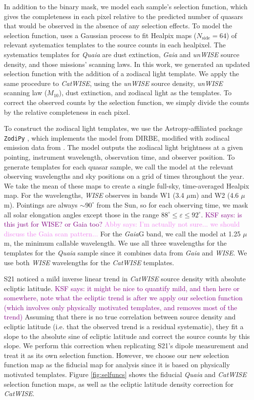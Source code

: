 \documentclass[modern]{aastex631}
\newcommand{\abby}[1]{\textcolor{violet}{Abby says: #1}}
\newcommand{\ksf}[1]{\textcolor{purple}{KSF says: #1}}
\newcommand{\catwise}{\textsl{CatWISE}\xspace}
\newcommand{\quaia}{\textsl{Quaia}\xspace}
\newcommand{\gaia}{\textsl{Gaia}\xspace}
\newcommand{\wise}{\textsl{WISE}\xspace}
\newcommand{\unwise}{\textsl{unWISE}\xspace}
\newcommand{\g}{\mathrm{G}}
\newcommand{\nside}{N_\mathrm{side}}
\begin{document}
In addition to the binary mask, we model each sample's selection function, which gives the completeness in each pixel relative to the predicted number of quasars that would be observed in the absence of any selection effects.
To model the selection function, \cite{storey-fisher_quaia_2024} uses a Gaussian process to fit Healpix maps ($\nside=64$) of relevant systematics templates to the source counts in each healpixel.
The systematics templates for \quaia are dust extinction, \gaia and \unwise source density, and those missions' scanning laws.
In this work, we generated an updated selection function with the addition of a zodiacal light template.
We apply the same procedure to \catwise, using the \unwise source density, \unwise scanning law ($M_{10}$), dust extinction, and zodiacal light as the templates.
To correct the observed counts by the selection function, we simply divide the counts by the relative completeness in each pixel.

To construct the zodiacal light templates, we use the Astropy-affiliated package \texttt{ZodiPy} \citep{san_zodipy_2024}, which implements the \citet{kelsall_cobe_1998} model from DIRBE, modified with zodiacal emission data from \citet{planck_collaboration_planck_2014}.
The model outputs the zodiacal light brightness at a given pointing, instrument wavelength, observation time, and observer position.
To generate templates for each quasar sample, we call the model at the relevant observing wavelengths and sky positions on a grid of times throughout the year.
We take the mean of these maps to create a single full-sky, time-averaged Healpix map.
For the wavelengths, \wise observes in bands W1 (3.4 $\mu$m) and W2 (4.6 $\mu$m).
Pointings are always $\sim 90^\circ$ from the Sun, so for each observing time, we mask all solar elongation angles except those in the range $88^\circ\le\varepsilon\le 92^\circ$. \ksf{is this just for WISE? or Gaia too?}
\abby{I'm actually not sure... we should discuss the Gaia scan pattern...}
For the \gaia $\g$ band, we call the model at 1.25 $\mu$m, the minimum callable wavelength.
We use all three wavelengths for the templates for the \quaia sample since it combines data from \gaia and \wise.
We use both \wise wavelengths for the \catwise templates.

S21 noticed a mild inverse linear trend in \catwise source density with absolute ecliptic latitude. \ksf{it might be nice to quantify mild, and then here or somewhere, note what the ecliptic trend is after we apply our selection function (which involves only physically motivated templates, and removes most of the trend)} 
Assuming that there is no true correlation between source density and ecliptic latitude (i.e. that the observed trend is a residual systematic), they fit a slope to the absolute sine of ecliptic latitude and correct the source counts by this slope.
We perform this correction when replicating S21's dipole measurement and treat it as its own selection function.
However, we choose our new selection function map as the fiducial map for analysis since it is based on physically motivated templates.
Figure \ref{fig:selfuncs} shows the fiducial \quaia and \catwise selection function maps, as well as the ecliptic latitude density correction for \catwise.
\end{document}
